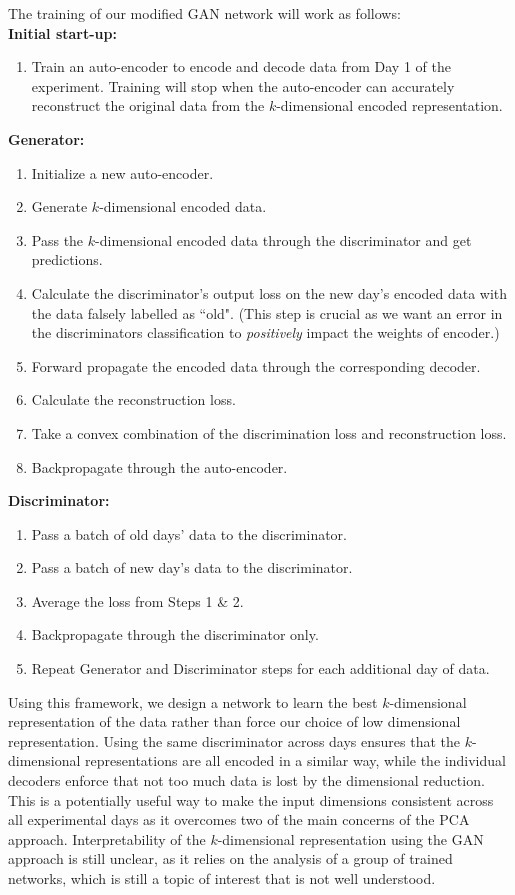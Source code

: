 \documentclass[12pt]{article}
\begin{document}
\indent The training of our modified GAN network will work as follows: \\
\textbf{Initial start-up:}
\begin{enumerate}
  \item Train an auto-encoder to encode and decode data from Day 1 of the experiment. Training will stop when the auto-encoder can accurately reconstruct the original data from the $k$-dimensional encoded representation.
\end{enumerate}
\textbf{Generator:}
\begin{enumerate}
  \item Initialize a new auto-encoder.
  \item Generate $k$-dimensional encoded data.
  \item Pass the $k$-dimensional encoded data through the discriminator and get predictions.
  \item Calculate the discriminator's output loss on the new day's encoded data with the data falsely labelled as ``old". (This step is crucial as we want an error in the discriminators classification to \textit{positively} impact the weights of encoder.)
  \item Forward propagate the encoded data through the corresponding decoder.
  \item Calculate the reconstruction loss.
  \item Take a convex combination of the discrimination loss and reconstruction loss.
  \item Backpropagate through the auto-encoder.
  \end{enumerate}
  \textbf{Discriminator:} \\
  \begin{enumerate}
    \item Pass a batch of old days' data to the discriminator.
    \item Pass a batch of new day's data to the discriminator.
    \item Average the loss from Steps 1 \& 2.
    \item Backpropagate through the discriminator only.
    \item Repeat Generator and Discriminator steps for each additional day of data.
  \end{enumerate}
\indent Using this framework, we design a network to learn the best $k$-dimensional representation of the data rather than force our choice of low dimensional representation. Using the same discriminator across days ensures that the $k$-dimensional representations are all encoded in a similar way, while the individual decoders enforce that not too much data is lost by the dimensional reduction. This is a potentially useful way to make the input dimensions consistent across all experimental days as it overcomes two of the main concerns of the PCA approach. Interpretability of the $k$-dimensional representation using the GAN approach is still unclear, as it relies on the analysis of a group of trained networks, which is still a topic of interest that is not well understood. \\
\end{document}
